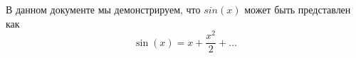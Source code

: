 \documentclass{twocolumn,a3paper}{article}
\begin{document}
В данном документе мы демонстрируем, что $sin(x)$ может быть представлен как
\begin{equation}
\sin(x)=x+\frac{x^2}{2}+\dots
\end{equation}
\end{document}
